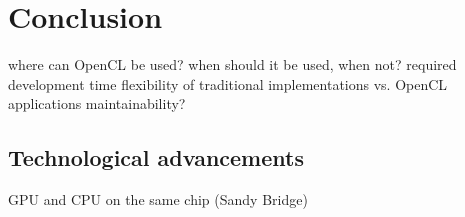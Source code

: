 \section{Conclusion}

where can OpenCL be used?
when should it be used, when not?
required development time
flexibility of traditional implementations vs. OpenCL applications
maintainability?

\subsection{Technological advancements}
GPU and CPU on the same chip (Sandy Bridge)
